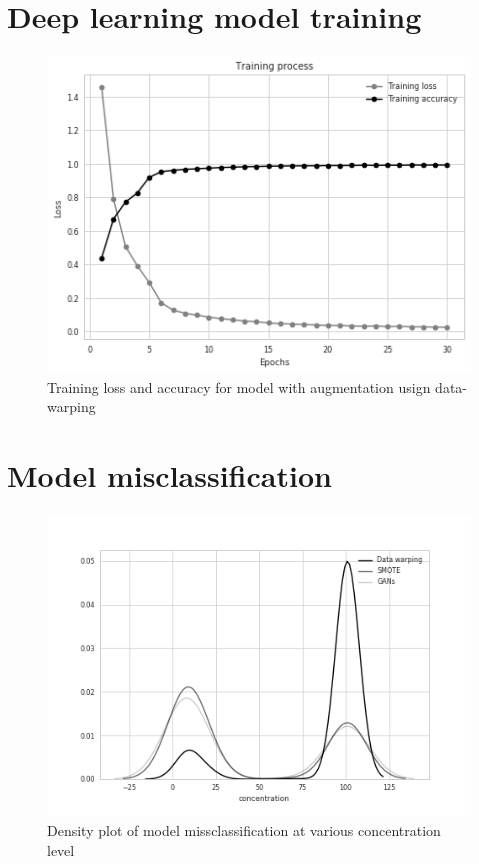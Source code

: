 \chapter{Deep learning model training}
\begin{figure}[ht]
	\begin{center}
		\includegraphics[width=\textwidth]{images/model_3.png}
		\caption{Training loss and accuracy for model with augmentation usign data-warping}
		\label{fig:third model}
	\end{center}
\end{figure}

\chapter{Model misclassification}
\begin{figure}[ht]
	\begin{center}
		\includegraphics[width=\textwidth]{images/models_evaluation.png}
		\caption{Density plot of model missclassification at various concentration level }
		\label{fig:miss-classification}
	\end{center}
\end{figure}
